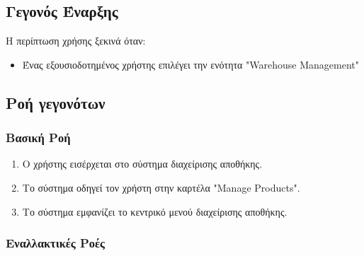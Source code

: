 \documentclass[12pt,a4paper,twoside]{book}
\begin{document}
\subsection{Γεγονός Έναρξης}
Η περίπτωση χρήσης ξεκινά όταν:
\begin{itemize}
  \item Ένας εξουσιοδοτημένος χρήστης επιλέγει την ενότητα "Warehouse Management" %
\end{itemize}

\subsection{Ροή γεγονότων}

\subsubsection{Βασική Ροή}
\begin{enumerate}
  \item Ο χρήστης εισέρχεται στο σύστημα διαχείρισης αποθήκης.
  \item Το σύστημα οδηγεί τον χρήστη στην καρτέλα "Manage Products". %
  \item Το σύστημα εμφανίζει το κεντρικό μενού διαχείρισης αποθήκης.
\end{enumerate}

\subsubsection{Εναλλακτικές Ροές}
\begin{enumerate}
\end{enumerate}
\end{document}
